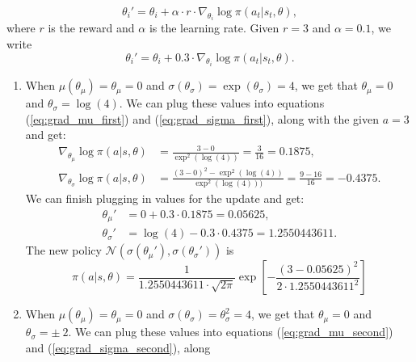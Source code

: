 \documentclass{article}
\begin{document}
\begin{enumerate}
	      \begin{equation}
		      \theta_i'=  \theta_i + \alpha \cdot r \cdot \nabla_{\theta_i} \log \pi(a_t|s_t, \theta),
	      \end{equation}
	      where $r$ is the reward and $\alpha$ is the learning rate. Given $r = 3$ and $\alpha = 0.1$,
	      we write
	      \begin{equation}
		      \theta_i'=  \theta_i + 0.3 \cdot \nabla_{\theta_i} \log \pi(a_t|s_t, \theta).
	      \end{equation}
	      \begin{enumerate}
		      \item When $\mu(\theta_\mu) = \theta_\mu = 0$ and $\sigma(\theta_\sigma)
			            = \exp(\theta_\sigma) = 4$, we get that $\theta_\mu = 0$ and $\theta_\sigma
			            = \log(4)$. We can plug these values into equations (\ref{eq:grad_mu_first}) and
		            (\ref{eq:grad_sigma_first}), along with the given $a=3$ and get:
		            \begin{align*}
			            \nabla_{\theta_\mu} \log \pi(a|s, \theta)    & = \frac{3-0}{\exp^2(\log(4))}
			            = \frac{3}{16} = 0.1875,                                                     \\
			            \nabla_{\theta_\sigma} \log \pi(a|s, \theta) & = \frac{
				            (3-0)^2-\exp^2(\log(4)) }{\exp^2(\log(4)))} = \frac{9 - 16}{16} = -0.4375.
		            \end{align*}
		            We can finish plugging in values for the update and get:
		            \begin{align}
			            \theta_\mu'    & =  0 + 0.3 \cdot 0.1875 = 0.05625,            \\
			            \theta_\sigma' & =  \log(4) - 0.3 \cdot 0.4375 = 1.2550443611.
		            \end{align}
		            The new policy $\mathcal{N}(\sigma(\theta_\mu'), \sigma(\theta_\sigma'))$ is
		            \begin{equation}
			            \pi(a|s, \theta) = \frac{1}{1.2550443611 \cdot \sqrt{2 \pi}}\exp\left[-\frac{(3
					            - 0.05625)^2}{2 \cdot 1.2550443611^2}\right]
		            \end{equation}
		      \item When $\mu(\theta_\mu) = \theta_\mu = 0$ and $\sigma(\theta_\sigma) = \theta_\sigma^2
			            = 4$, we get that $\theta_\mu = 0$ and $\theta_\sigma = \pm ~ 2$. We can plug these
		            values into equations (\ref{eq:grad_mu_second}) and (\ref{eq:grad_sigma_second}), along

\end{enumerate}
\end{enumerate}
\end{document}
